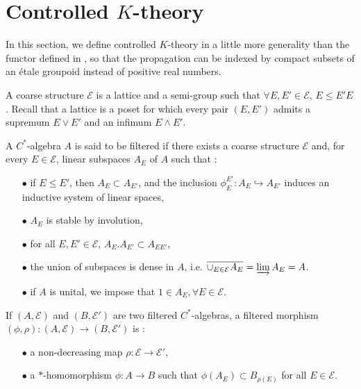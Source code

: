 \section{Controlled $K$-theory}

In this section, we define controlled $K$-theory in a little more generality than the functor defined in \cite{OY2}, so that the propagation can be indexed by compact subsets of an étale groupoid instead of positive real numbers.\\

\begin{definition}
A coarse structure $\mathcal E$ is a lattice and a semi-group such that $\forall E,E'\in \mathcal E$, $E\leq E'E$. Recall that a lattice is a poset for which every pair $(E,E')$ admits a supremum $E\vee E'$ and an infimum $E\wedge E'$.
\end{definition}

\begin{definition}
A $C^*$-algebra $A$ is said to be filtered if there exists a coarse structure $\mathcal E$ and, for every $E\in \mathcal E$, linear subspaces $A_E$ of $A$ such that :\\
\begin{itemize}
\item[$\bullet$] if $E \leq E'$, then $A_E\subset A_{E'}$, and the inclusion $\phi_E^{E'}: A_E\hookrightarrow A_{E'}$ induces an inductive system of linear spaces,
\item[$\bullet$] $A_E$ is stable by involution,
\item[$\bullet$] for all $E,E'\in\mathcal E$, $A_E.A_{E'}\subset A_{EE'}$,
\item[$\bullet$] the union of subspaces is dense in $A$, i.e. $\overline{\cup_{E\in\mathcal E}A_E} = \varinjlim A_E = A$.
\item[$\bullet$] if $A$ is unital, we impose that $1\in A_E,\forall E\in\mathcal E$.\\
\end{itemize}
\end{definition}

If $(A,\mathcal E)$ and $(B,\mathcal E')$ are two filtered $C^*$-algebras, a filtered morphism $(\phi,\rho): (A,\mathcal E)\rightarrow (B,\mathcal E')$ is :
\begin{itemize}
\item[$\bullet$] a non-decreasing map $\rho : \mathcal E\rightarrow \mathcal E'$,
\item[$\bullet$] a $*$-homomorphism $\phi: A\rightarrow B$ such that $\phi (A_E)\subset B_{\rho(E)}$ for all $E\in\mathcal E$.
\end{itemize}

